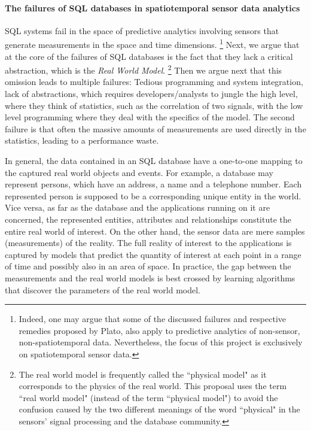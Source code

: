 
\paragraph{The failures of SQL databases in spatiotemporal sensor data analytics}
SQL systems fail in the space of predictive analytics involving sensors that generate measurements in the space and time dimensions.%
\footnote{Indeed, one may argue that some of the discussed failures and respective remedies proposed by Plato, also apply to predictive analytics of non-sensor, non-spatiotemporal data. Nevertheless, the focus of this project is exclusively on spatiotemporal sensor data.
}
Next, we argue that at the core of the failures of SQL databases is the fact that they lack a critical abstraction, which is the {\em Real World Model}.%
\footnote{The real world model is frequently called the ``physical model" as it corresponds to the physics of the real world. This proposal uses the term ``real world model" (instead of the term ``physical model") to avoid the confusion caused by the two different meanings of the word ``physical" in the sensors' signal processing and the database community.
}
Then we argue next that this omission leads to multiple failures: Tedious programming and system integration, lack of abstractions, which requires developers/analysts to jungle the high level, where they think of statistics, such as the correlation of two signals, with the low level programming where they deal with the specifics of the model. The second failure is that often the massive amounts of measurements are used directly in the statistics, leading to a performance waste.

In general, the data contained in an SQL database have a one-to-one mapping to the captured real world objects and events. For example, a database may represent persons, which have an address, a name and a telephone number. Each represented person is supposed to be a corresponding unique entity in the world. Vice versa, as far as the database and the applications running on it are concerned, the represented entities, attributes and relationships constitute the entire real world of interest. On the other hand, the sensor data are mere samples (measurements) of the reality. The full reality of interest to the applications is captured by models that predict the quantity of interest at each point in a range of time and possibly also in an area of space. In practice, the gap between the measurements and the real world models is best crossed by learning algorithms that discover the parameters of the real world model. 

